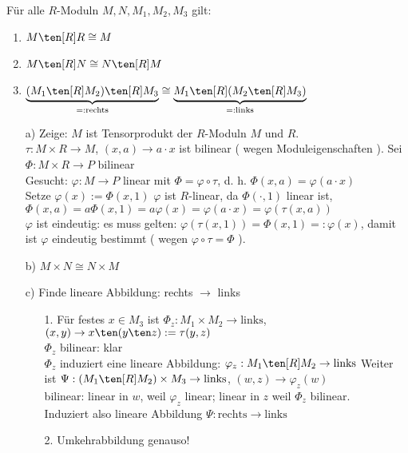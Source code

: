 \begin{Bem}
  Für alle $R$-Moduln $M, N, M_1, M_2, M_3$ gilt:
  \begin{enumerate}
  	\item $M \ten[R] R \cong M$
  	\item $M \ten[R] N \cong N \ten[R] M$
  	\item $\underbrace{(M_1 \ten[R] M_2) \ten[R] M_3}_{=: \text{rechts}} \cong 
	\underbrace{M_1 \ten[R] ( M_2 \ten[R] M_3)}_{=: \text{links}}$
  \end{enumerate}
\end{Bem}
\begin{Bew}
  \begin{enumerate}
    \item[a)] Zeige: $M$ ist Tensorprodukt der $R$-Moduln $M$ und $R$.\\
	  $\tau: M \times R \rightarrow M$, $(x,a) \rightarrow a \cdot x$ ist bilinear ( wegen 
	  Moduleigenschaften ). Sei $\Phi: M \times R \rightarrow P$ bilinear\\
	  Gesucht: $\varphi: M \rightarrow P$ linear mit $\Phi = \varphi \circ \tau$, d. h. 
	  $\Phi(x,a) = \varphi(a \cdot x)$\\
	  Setze $\varphi(x) := \Phi(x,1)$ $\varphi$ ist $R$-linear, da $\Phi( \cdot, 1)$ linear
	  ist, $\Phi(x,a) = a\Phi(x,1) = a\varphi(x) = \varphi(a \cdot x ) = \varphi(\tau(x,a))$\\
	  $\varphi$ ist eindeutig: es muss gelten: $\varphi(\tau(x,1)) = \Phi(x,1) =: \varphi(x)$, 
	  damit ist $\varphi$ eindeutig bestimmt ( wegen $\varphi \circ \tau = \Phi$ ).
    \item[b)] $M \times N \cong N \times M$
    \item[c)] Finde lineare Abbildung: rechts $\rightarrow$ links
	  \begin{enumerate}
	    \item[ 1. ] Für festes $x \in M_3$ ist $\Phi_z: M_1 \times M_2 \rightarrow \text{links}$, 
		  $(x,y) \rightarrow x \ten (y \ten z) := \tau ( y,z )$\\
		  $\Phi_z$ bilinear: klar\\
		  $\Phi_z$ induziert eine lineare Abbildung: $\varphi_z: M_1 \ten[R] M_2 \rightarrow \text{links}$
		  Weiter ist $\Psi: ( M_1 \ten[R] M_2 ) \times M_3 \rightarrow \text{links}$,
		  $(w,z) \rightarrow \varphi_z (w)$\\
		  bilinear: linear in $w$, weil $\varphi_z$ linear; linear in $z$ weil $\Phi_z$ bilinear.\\
		  Induziert also lineare Abbildung $\Psi: \text{rechts} \rightarrow \text{links}$
	    \item[ 2. ] Umkehrabbildung genauso!
	  \end{enumerate}
  \end{enumerate}
\end{Bew}

